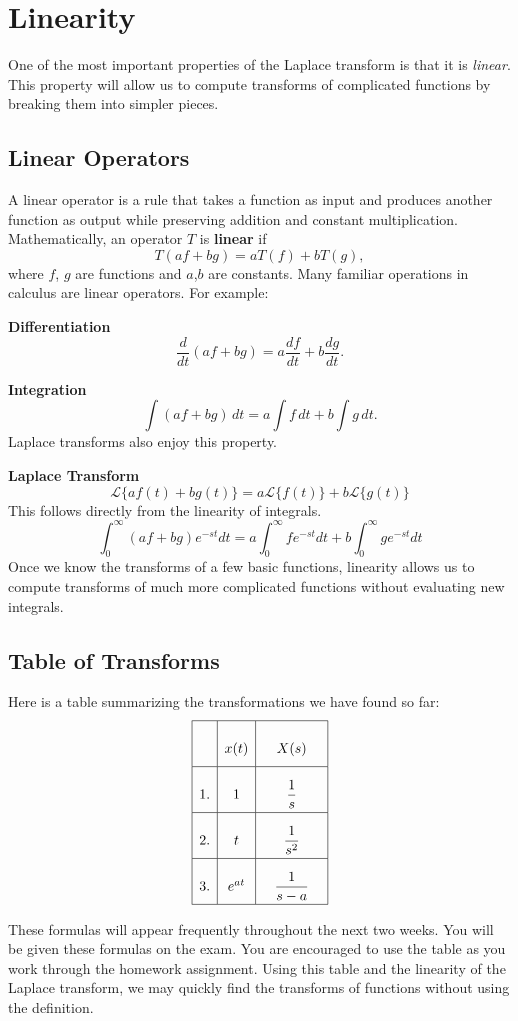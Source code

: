 \documentclass[10pt,letterpaper]{article}
\begin{document}
\section{Linearity}
One of the most important properties of the Laplace transform is that it is
\textit{linear}. This property will allow us to compute transforms of complicated
functions by breaking them into simpler pieces.

\subsection{Linear Operators}
A linear operator is a rule that takes a function as input and produces another
function as output while preserving addition and constant multiplication.
Mathematically, an operator $T$ is \textbf{linear} if
\[
T(af+bg)=aT(f)+bT(g), 
\]
where $f$, $g$ are functions and $a$,$b$ are constants. Many familiar operations in calculus are linear operators. For example:

\textbf{Differentiation}
\[
\frac{d}{dt}(af+bg)=a\frac{df}{dt}+b\frac{dg}{dt}.
\]

\textbf{Integration}
\[
\int (af+bg)\,dt
=
a\int f\,dt + b\int g\,dt.
\]
Laplace transforms also enjoy this property.

\textbf{Laplace Transform}
\[
\boxed{
\mathcal{L}\{af(t)+bg(t)\}
=
a\mathcal{L}\{f(t)\}+b\mathcal{L}\{g(t)\}
}
\]
This follows directly from the linearity of integrals.
\[
\int_0^\infty (af+bg)e^{-st}dt
=
a\int_0^\infty fe^{-st}dt
+
b\int_0^\infty ge^{-st}dt
\]
Once we know the transforms of a few basic functions, linearity allows us to
compute transforms of much more complicated functions without evaluating new
integrals.

\subsection{Table of Transforms}

Here is a table summarizing the transformations we have found so far:
\[
\renewcommand{\arraystretch}{2.7}
\begin{array}{|c|c|c|}
\hline
 &  x(t) & \quad X(s) \quad \\ 
\hline
1. & 1 & \dfrac{1}{s} \\ 
\hline
2. & t & \dfrac{1}{s^2} \\ 
\hline
3. & e^{at} & \dfrac{1}{s-a} \\ 
\hline
\end{array}
\]

These formulas will appear frequently throughout the next two weeks. You will be given these formulas on the exam. You are encouraged to use the table as you work through the homework assignment. Using this table and the linearity of the Laplace transform, we may quickly find the transforms of functions without using the definition.
\end{document}
